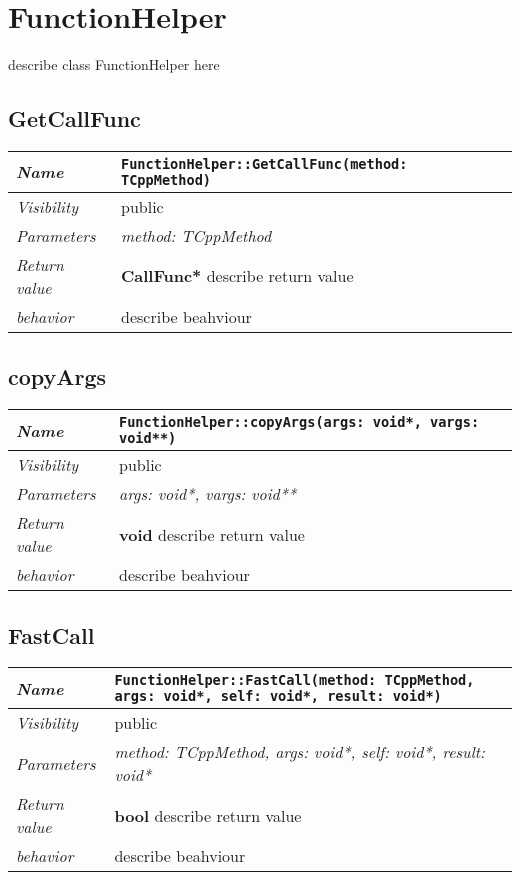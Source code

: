 \chapter{FunctionHelper}
describe class FunctionHelper here
\section{GetCallFunc}
\begin{longtable}{p{3cm} @{\hskip 1cm} p{12cm}}
 \hline
\textit{Name} & \texttt{FunctionHelper::GetCallFunc(method: TCppMethod)}\\
\hline
 \textit{Visibility} & public\\
\hline
\textit{Parameters} & \textit{method: TCppMethod}\\
\hline
\textit{Return value} & \textbf{ CallFunc*} describe return value\\
  \hline
 \textit{behavior} & describe beahviour \\
\hline
\end{longtable} \pagebreak
 \section{copyArgs}
\begin{longtable}{p{3cm} @{\hskip 1cm} p{12cm}}
 \hline
\textit{Name} & \texttt{FunctionHelper::copyArgs(args: void*, vargs: void**)}\\
\hline
 \textit{Visibility} & public\\
\hline
\textit{Parameters} & \textit{args: void*, vargs: void**}\\
\hline
\textit{Return value} & \textbf{ void} describe return value\\
  \hline
 \textit{behavior} & describe beahviour \\
\hline
\end{longtable} \pagebreak
 \section{FastCall}
\begin{longtable}{p{3cm} @{\hskip 1cm} p{12cm}}
 \hline
\textit{Name} & \texttt{FunctionHelper::FastCall(method: TCppMethod, args: void*, self: void*, result: void*)}\\
\hline
 \textit{Visibility} & public\\
\hline
\textit{Parameters} & \textit{method: TCppMethod, args: void*, self: void*, result: void*}\\
\hline
\textit{Return value} & \textbf{ bool} describe return value\\
  \hline
 \textit{behavior} & describe beahviour \\
\hline
\end{longtable} \pagebreak
